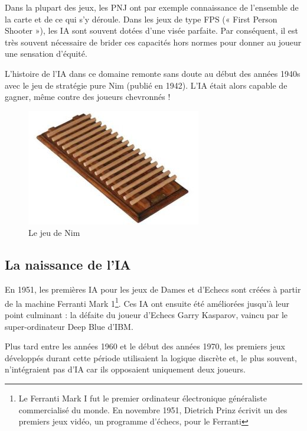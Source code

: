 \documentclass[a4paper, 12pt]{article} %
\begin{document}
Dans la plupart des jeux, les PNJ ont par exemple connaissance de l’ensemble de la carte et de ce qui s’y déroule. Dans les jeux de type FPS (« First Person Shooter »), les IA sont souvent dotées d’une visée parfaite. Par conséquent, il est très souvent nécessaire de brider ces capacités hors normes pour donner au joueur une sensation d’équité. 

L’histoire de l’IA dans ce domaine remonte sans doute au début des années 1940s avec le jeu de stratégie pure Nim (publié en 1942). L’IA était alors capable de gagner, même contre des joueurs chevronnés !

\begin{figure}[!h]%
	\begin{center} 
		\includegraphics[width=0.60\columnwidth]{images/nim.png}%
		\caption{Le jeu de Nim}%
	\end{center}
\end{figure}

\newpage
\subsection{La naissance de l’IA}
En 1951, les premières IA pour les jeux de Dames et d’Echecs sont créées à partir de la machine Ferranti Mark 1\footnote{Le Ferranti Mark I fut le premier ordinateur électronique généraliste commercialisé du monde. En novembre 1951, Dietrich Prinz écrivit un des premiers jeux vidéo, un programme d’échecs, pour le Ferranti}. Ces IA ont ensuite été améliorées jusqu’à leur point culminant : la défaite du joueur d’Echecs Garry Kasparov, vaincu par le super-ordinateur Deep Blue d’IBM. 

Plus tard entre les années 1960 et le début des années 1970, les premiers jeux développés durant cette période utilisaient la logique discrète et, le plus souvent, n’intégraient pas d’IA car ils opposaient uniquement deux joueurs. 
\end{document}
